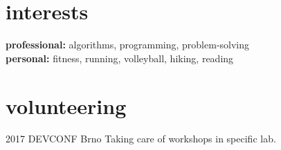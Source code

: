 \documentclass[]{friggeri-cv} %
\begin{document}

\section{interests}

\textbf{professional:} algorithms, programming, problem-solving \\\textbf{personal:} fitness, running, volleyball, hiking, reading


\section{volunteering}

\begin{entrylist}

\entry
{2017}
{DEVCONF}
{Brno}
{Taking care of workshops in specific lab.}
\end{entrylist}

\end{document}
